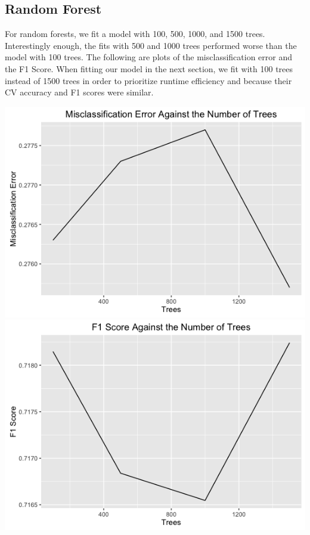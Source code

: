 \documentclass{article}
\begin{document}
\subsection{Random Forest}
For random forests, we fit a model with 100, 500, 1000, and 1500 trees. Interestingly enough, the fits with 500 and 1000 trees performed worse than the model with 100 trees. The following are plots of the misclassification error and the F1 Score. When fitting our model in the next section, we fit with 100 trees instead of 1500 trees in order to prioritize runtime efficiency and because their CV accuracy and  F1 scores were similar. \\

\centerline{\includegraphics[scale=.35]{diagrams/6rf.png}\includegraphics[scale=.35]{diagrams/7rf.png}}
\end{document}
